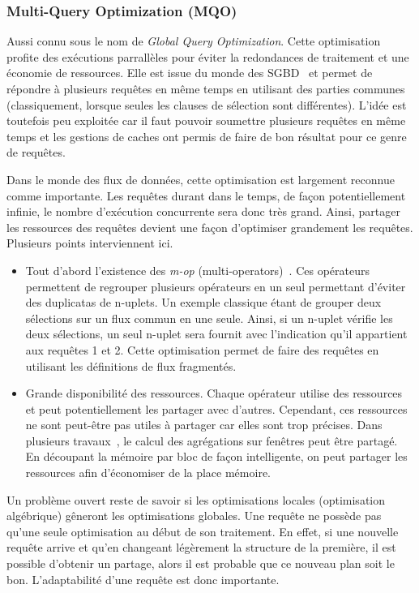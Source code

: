 \subsubsection{Multi-Query Optimization (MQO)}
Aussi connu sous le nom de \textit{Global Query Optimization}. Cette optimisation profite des exécutions parrallèles pour éviter la redondances de traitement et une économie de ressources. Elle est issue du monde des SGBD~\cite{Sellis:mqo} et permet de répondre à plusieurs requêtes en même temps en utilisant des parties communes (classiquement, lorsque seules les clauses de sélection sont différentes). L'idée est toutefois peu exploitée car il faut pouvoir soumettre plusieurs requêtes en même temps et les gestions de caches ont permis de faire de bon résultat pour ce genre de requêtes. 

Dans le monde des flux de données, cette optimisation est largement reconnue comme importante. Les requêtes durant dans le temps, de façon potentiellement infinie, le nombre d'exécution concurrente sera donc très grand. Ainsi, partager les ressources des requêtes devient une façon d'optimiser grandement les requêtes. Plusieurs points interviennent ici.
\begin{itemize}
 \item Tout d'abord l'existence des \textit{m-op} (multi-operators)~\cite{Hong:mqo}. Ces opérateurs permettent de regrouper plusieurs opérateurs en un seul permettant d'éviter des duplicatas de n-uplets. Un exemple classique étant de grouper deux sélections sur un flux commun en une seule. Ainsi, si un n-uplet vérifie les deux sélections, un seul n-uplet sera fournit avec l'indication qu'il appartient aux requêtes 1 et 2. Cette optimisation permet de faire des requêtes en utilisant les définitions de flux fragmentés.
 \item Grande disponibilité des ressources. Chaque opérateur utilise des ressources et peut potentiellement les partager avec d'autres. Cependant, ces ressources ne sont peut-être pas utiles à partager car elles sont trop précises. Dans plusieurs travaux~\cite{Arasu:resource}, le calcul des agrégations sur fenêtres peut être partagé. En découpant la mémoire par bloc de façon intelligente, on peut partager les ressources afin d'économiser de la place mémoire.
\end{itemize}

Un problème ouvert reste de savoir si les optimisations locales (optimisation algébrique) gêneront les optimisations globales. Une requête ne possède pas qu'une seule optimisation au début de son traitement. En effet, si une nouvelle requête arrive et qu'en changeant légèrement la structure de la première, il est possible d'obtenir un partage, alors il est probable que ce nouveau plan soit le bon. L'adaptabilité d'une requête est donc importante.

